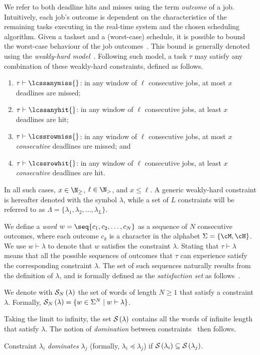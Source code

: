 We refer to both deadline hits and misses using the term \emph{outcome} of a job.
Intuitively, each job's outcome is dependent on the characteristics of the remaining tasks executing in the real-time system and the chosen scheduling algorithm.
Given a taskset and a (worst-case) schedule, it is possible to bound the worst-case behaviour of the job outcomes~\cite{Bernat:2001, Ernst:2015}.
This bound is generally denoted using the \emph{weakly-hard model}~\cite{Bernat:2001}.
Following such model, a task $\tau$ may satisfy any combination of these weakly-hard constraints, defined as follows.
\begin{enumerate}[label=(\roman*)]
    \item \label{item:mk} $\tau \vdash \lcssanymiss{}$: in any window of $\ell$ consecutive jobs, at most $x$ deadlines are missed;
    \item \label{item:hk} $\tau \vdash \lcssanyhit{}$: in any window of $\ell$ consecutive jobs, at least $x$ deadlines are hit;
    \item \label{item:cons} $\tau \vdash \lcssrowmiss{}$: in any window of $\ell$ consecutive jobs, at most $x$ \emph{consecutive} deadlines are missed; and
    \item $\tau \vdash \lcssrowhit{}$: in any window of $\ell$ consecutive jobs, at least $x$ \emph{consecutive} deadlines are hit.
\end{enumerate}
In all such cases, $x\in \N_{\geq}$, $\ell \in \N_{>}$, and $x\leq \ell$.
A generic weakly-hard constraint is hereafter denoted with the symbol $\lambda$, while a set of $L$ constraints will be referred to as $\Lambda = \{ \lambda_1, \lambda_2, \dots, \lambda_L \}$.

We define a \emph{word} $w= \seq{c_1, c_2, \dots, c_N}$ as a sequence of $N$ consecutive outcomes, where each outcome $c_k$ is a character in the alphabet $\Sigma = \{\cM, \cH\}$.
We use $w \vdash \lambda$ to denote that $w$ satisfies the constraint $\lambda$. 
Stating that $\tau \vdash \lambda$ means that all the possible sequences of outcomes that $\tau$ can experience satisfy the corresponding constraint $\lambda$.
The set of such sequences naturally results from the definition of $\lambda$, and is formally defined as the \emph{satisfaction set} as follows~\cite{Bernat:2001}.

\begin{definition}%
    \label{def:satisfaction}%
    We denote with $\mathcal{S}_{N}\left( \lambda \right)$ the set of words of length $N \geq 1$ that satisfy a constraint $\lambda$.
    Formally, $\mathcal{S}_{N}\left( \lambda \right) = \{ w \in \Sigma^N \mid w \vdash \lambda \}$.
\end{definition}
Taking the limit to infinity, the set $\mathcal{S}_{}\left( \lambda \right)$ contains all the words of infinite length that satisfy $\lambda$.
The notion of \emph{domination} between constraints~\cite{Bernat:2001} then follows.
\begin{definition}%
    \label{def:domination}%
    Constraint $\lambda_i$ \emph{dominates} $\lambda_j$ (formally, $\lambda_i \preceq \lambda_j$) if $\mathcal{S}_{}\left( \lambda_i \right) \subseteq \mathcal{S}_{}\left( \lambda_j \right)$. 
\end{definition}


